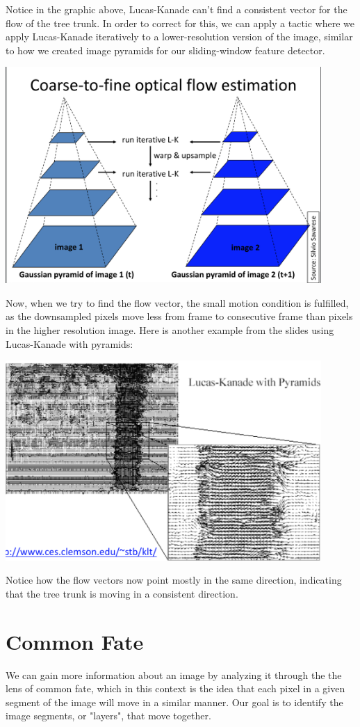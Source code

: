 \documentclass{article}
\begin{document}
Notice in the graphic above, Lucas-Kanade can't find a consistent vector for the flow of the tree trunk. In order to correct for this, we can apply a tactic where we apply Lucas-Kanade iteratively to a lower-resolution version of the image, similar to how we created image pyramids for our sliding-window feature detector.

\includegraphics[width=12cm]{lk-pyr.png}

Now, when we try to find the flow vector, the small motion condition is fulfilled, as the downsampled pixels move less from frame to consecutive frame than pixels in the higher resolution image. Here is another example from the slides using Lucas-Kanade with pyramids:

\includegraphics[width=12cm]{w_pyr.png}

Notice how the flow vectors now point mostly in the same direction, indicating that the tree trunk is moving in a consistent direction. 

\section{Common Fate}
We can gain more information about an image by analyzing it through the the lens of common fate, which in this context is the idea that each pixel in a given segment of the image will move in a similar manner. Our goal is to identify the image segments, or "layers", that move together.
\end{document}
